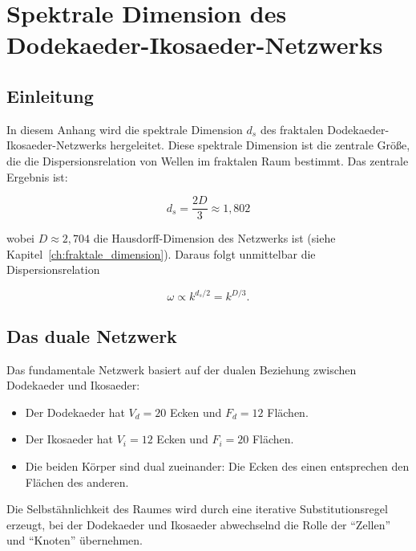 
\chapter{Spektrale Dimension des Dodekaeder-Ikosaeder-Netzwerks}
\label{app:spektrale_dimension}

\section{Einleitung}
\label{app:spektrale_einleitung}

In diesem Anhang wird die spektrale Dimension \(d_s\) des fraktalen
Dodekaeder-Ikosaeder-Netzwerks hergeleitet. Diese spektrale Dimension
ist die zentrale Größe, die die Dispersionsrelation von Wellen im
fraktalen Raum bestimmt. Das zentrale Ergebnis ist:

\[
d_s = \frac{2D}{3} \approx 1,802
\]

wobei \(D \approx 2,704\) die Hausdorff-Dimension des Netzwerks ist
(siehe Kapitel~\ref{ch:fraktale_dimension}).
Daraus folgt unmittelbar die Dispersionsrelation

\[
\omega \propto k^{d_s/2} = k^{D/3}.
\]

\section{Das duale Netzwerk}
\label{app:spektrale_dual}

Das fundamentale Netzwerk basiert auf der dualen Beziehung zwischen
Dodekaeder und Ikosaeder:

\begin{itemize}
    \item Der Dodekaeder hat \(V_d = 20\) Ecken und \(F_d = 12\) Flächen.
    \item Der Ikosaeder hat \(V_i = 12\) Ecken und \(F_i = 20\) Flächen.
    \item Die beiden Körper sind dual zueinander: Die Ecken des einen
          entsprechen den Flächen des anderen.
\end{itemize}

Die Selbstähnlichkeit des Raumes wird durch eine iterative
Substitutionsregel erzeugt, bei der Dodekaeder und Ikosaeder
abwechselnd die Rolle der \enquote{Zellen} und \enquote{Knoten}
übernehmen.

